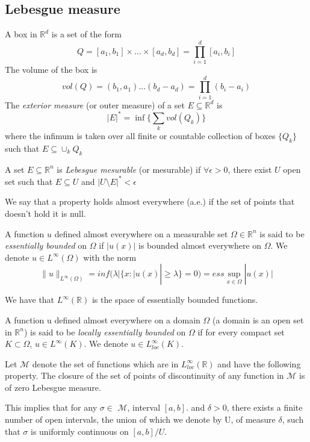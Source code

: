 \documentclass[../main.tex]{subfiles}
\begin{document}
\subsection{Lebesgue measure}

\begin{definition} A box in $\mathbb{R}^d$ is a set of the form 
	$$ Q = [a_1,b_1]  \times ... \times [a_d,b_d] = \prod_{i=1}^d [a_i,b_i]$$
	The volume of the box is $$ vol(Q)= (b_1,a_1) ... (b_d-a_d)= \prod_{i=1}^d (b_i-a_i)$$
	The \emph{exterior measure} (or outer measure) of a set $E\subseteq \mathbb{R}^d$ is $$ |E|^* = \inf\{\sum_k vol(Q_k)\} $$ 
	where the infimum is taken over all finite or countable collection of boxes $\{Q_k\}$ such that $E \subseteq \cup_k Q_k$
\end{definition}

\begin{definition}
A set $E\subseteq \mathbb{R}^n $ is \emph{Lebesgue mesurable} (or mesurable) if $\forall \epsilon >0$, there exist $U$ open set such that $E \subseteq U$ and $|U\setminus E|^* < \epsilon $
\end{definition}

\begin{definition}
	We say that a property holds almost everywhere (a.e.) if the set of points that doesn’t hold it is null.
\end{definition}
\begin{definition}
	A function $u$ defined almost everywhere on a measurable set $\Omega \in \mathbb{R}^n$ is said to be \emph{essentially bounded} on $\Omega$ if $|u(x)|$ is bounded almost everywhere on $\Omega$. We denote $u\in L^{\infty}(\Omega)$ with the norm $$\|u\|_{L^{\infty}(\Omega)}= inf(\lambda | \{ x : |u(x)| \geq \lambda \} = 0 ) = ess \sup_{x\in \Omega} |u(x)|$$

\end{definition}

\noindent We have that $L^{\infty}(\mathbb{R})$ is the space of essentially bounded functions.


\begin{definition}
	A function u defined almost everywhere on a domain $\Omega$ (a domain is an open set in $\mathbb{R}^n$) is said to be\emph{ locally essentially bounded }on $\Omega$ if for every compact set $K\subset \Omega$, $u\in L^{\infty}(K)$. We denote $u\in L_{loc}^{\infty}(K)$.
\end{definition}

\begin{definition} Let  $\mathcal{M}$ denote the set of functions which are in $L_{loc}^{\infty}(\mathbb{R})$ and have the following property. The closure of the set of points of discontinuity of any function in $\mathcal{M}$ is of zero Lebesgue measure. 
\end{definition}
\noindent This implies that for any $\sigma \in$ $\mathcal{M}$, interval $[a,b] .$ and $\delta >0$, there exists a finite number of open intervals, the union of which we denote by U, of measure $\delta$, such that $\sigma$ is uniformly continuous on $[a,b]/U$. 
\end{document}

